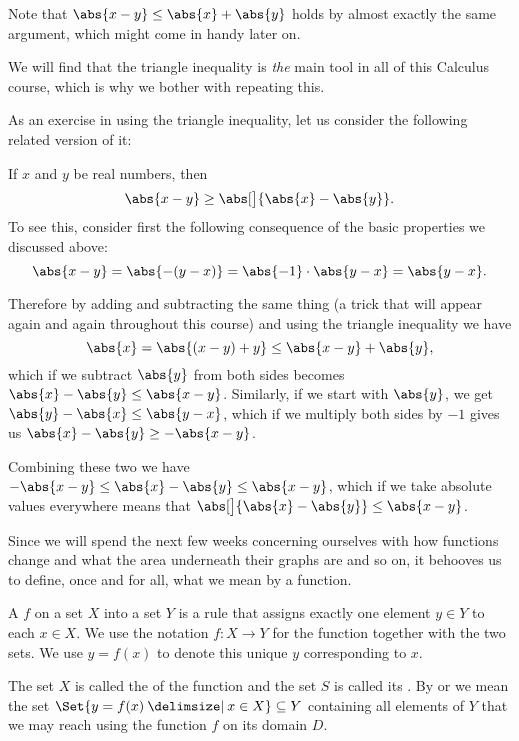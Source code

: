 \noindent
Note that $\abs{x - y} \leq \abs{x} + \abs{y}$ holds by almost exactly the same argument, which might come in handy later on.

We will find that the triangle inequality is \emph{the} main tool in all of this Calculus course, which is why we bother with repeating this.

As an exercise in using the triangle inequality, let us consider the following related version of it:

\begin{example}
	If $x$ and $y$ be real numbers, then
	\[
		\abs{x - y} \geq \abs[\big]{\abs{x} - \abs{y}}.
	\]
	To see this, consider first the following consequence of the basic properties we discussed above:
	\[
		\abs{x - y} = \abs{-(y - x)} = \abs{-1} \cdot \abs{y - x} = \abs{y - x}.
	\]

	\noindent
	Therefore by adding and subtracting the same thing (a trick that will appear again and again throughout this course) and using the triangle inequality we have
	\[
		\abs{x} = \abs{(x - y) + y} \leq \abs{x - y} + \abs{y},
	\]
	which if we subtract $\abs{y}$ from both sides becomes $\abs{x} - \abs{y} \leq \abs{x - y}$.
	Similarly, if we start with $\abs{y}$, we get $\abs{y} - \abs{x} \leq \abs{y - x}$, which if we multiply both sides by $-1$ gives us $\abs{x} - \abs{y} \geq - \abs{x - y}$.

	Combining these two we have $- \abs{x - y} \leq \abs{x} - \abs{y} \leq \abs{x - y}$, which if we take absolute values everywhere means that $\abs[\big]{\abs{x} - \abs{y}} \leq \abs{x - y}$.
\end{example}


Since we will spend the next few weeks concerning ourselves with how functions change and what the area underneath their graphs are and so on, it behooves us to define, once and for all, what we mean by a function.

\begin{definition}
	A  $f$ on a set $X$ into a set $Y$ is a rule that assigns exactly one element $y \in Y$ to each $x \in X$.
	We use the notation $f \colon X \to Y$ for the function together with the two sets.
	We use $y = f(x)$ to denote this unique $y$ corresponding to $x$.

	The set $X$ is called the  of the function and the set $S$ is called its .
	By  or  we mean the set $\Set{y = f(x) \given x \in X} \subseteq Y$ containing all elements of $Y$ that we may reach using the function $f$ on its domain $D$.
\end{definition}

